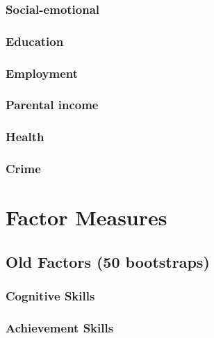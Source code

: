 \documentclass[11pt]{article}
\begin{document}
    \subsubsection{Social-emotional}
    

    \subsubsection{Education}
    

    \subsubsection{Employment}
    

    \subsubsection{Parental income}
    

    \subsubsection{Health}
    

    \subsubsection{Crime}
    

\newpage

\section{Factor Measures}

  \subsection{Old Factors (50 bootstraps)}

    \subsubsection{Cognitive Skills}
    

    \subsubsection{Achievement Skills}
    
\end{document}

